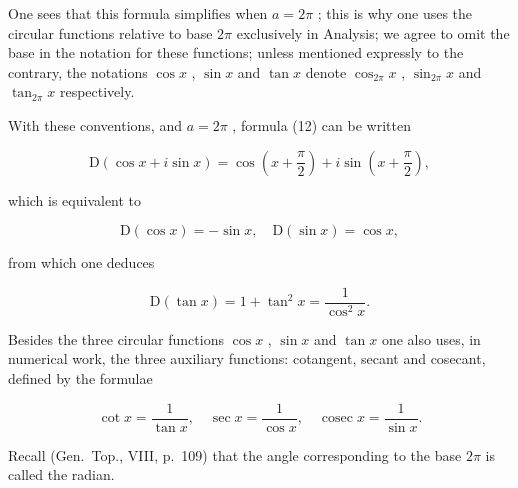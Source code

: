 One sees that this formula simplifies when \(a = 2\pi\) ; this is why one uses the circular functions relative to base \(2\pi\) exclusively in Analysis; we agree to omit the base in the notation for these functions; unless mentioned expressly to the contrary, the notations \(\cos x\) , \(\sin x\) and \(\tan x\) denote \(\cos_{2\pi}x\) , \(\sin_{2\pi}x\) and \(\tan_{2\pi}x\) respectively.

With these conventions, and \(a = 2\pi\) , formula (12) can be written

\[
\mathrm{D} (\cos x + i \sin x) = \cos \left(x + \frac {\pi}{2}\right) + i \sin \left(x + \frac {\pi}{2}\right),\tag{13}
\]

which is equivalent to

\[
\mathrm{D} (\cos x) = - \sin x, \quad \mathrm{D} (\sin x) = \cos x,
\]

from which one deduces

\[
\mathrm{D} (\tan x) = 1 + \tan^ {2} x = \frac {1}{\cos^ {2} x}.\tag{15}
\]

Besides the three circular functions \(\cos x\) , \(\sin x\) and \(\tan x\) one also uses, in numerical work, the three auxiliary functions: cotangent, secant and cosecant, defined by the formulae

\[
\cot x = \frac {1}{\tan x}, \quad \sec x = \frac {1}{\cos x}, \quad \operatorname{cosec} x = \frac {1}{\sin x}.
\]

Recall (Gen.~Top., VIII, p.~109) that the angle corresponding to the base \(2\pi\) is called the radian.

